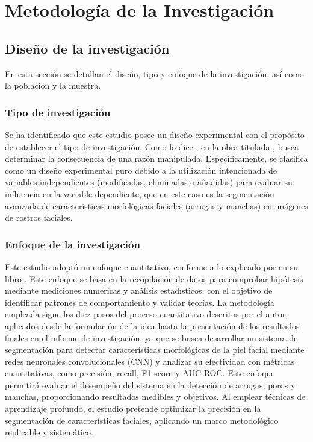 \chapter{Metodología de la Investigación}
\section{Diseño de la investigación}
En esta sección se detallan el diseño, tipo y enfoque de la investigación, así como la población y la muestra.

\subsection{Tipo de investigación}
Se ha identificado que este estudio posee un diseño experimental con el propósito de establecer el tipo de investigación. Como lo dice \cite{bk_hernandez2014metodologia}, en la obra titulada , busca determinar la consecuencia de una razón manipulada. Específicamente, se clasifica como un diseño experimental puro debido a la utilización intencionada de variables independientes (modificadas, eliminadas o añadidas) para evaluar su influencia en la variable dependiente, que en este caso es la segmentación avanzada de características morfológicas faciales (arrugas y manchas) en imágenes de rostros faciales.

\subsection{Enfoque de la investigación}
Este estudio adoptó un enfoque cuantitativo, conforme a lo explicado por \cite{bk_hernandez2014metodologia} en su libro . Este enfoque se basa en la recopilación de datos para comprobar hipótesis mediante mediciones numéricas y análisis estadísticos, con el objetivo de identificar patrones de comportamiento y validar teorías. La metodología empleada sigue los diez pasos del proceso cuantitativo descritos por el autor, aplicados desde la formulación de la idea hasta la presentación de los resultados finales en el informe de investigación, ya que se busca desarrollar un sistema de segmentación para detectar características morfológicas de la piel facial mediante redes neuronales convolucionales (CNN) y analizar su efectividad con métricas cuantitativas, como precisión, recall, F1-score y AUC-ROC. Este enfoque permitirá evaluar el desempeño del sistema en la detección de arrugas, poros y manchas, proporcionando resultados medibles y objetivos. \parencite{esteva2017} Al emplear técnicas de aprendizaje profundo, el estudio pretende optimizar la precisión en la segmentación de características faciales, aplicando un marco metodológico replicable y sistemático. \parencite{phillips2020}

